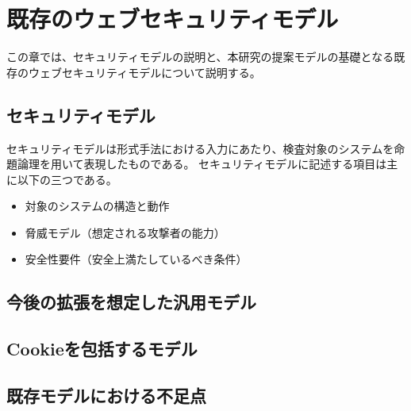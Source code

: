 \documentclass[12pt,a4paper]{jbook}
\begin{document}
\chapter{既存のウェブセキュリティモデル}
この章では、セキュリティモデルの説明と、本研究の提案モデルの基礎となる既存のウェブセキュリティモデルについて説明する。

\section{セキュリティモデル}
\label{sec:SecurityModel}
セキュリティモデルは形式手法における入力にあたり、検査対象のシステムを命題論理を用いて表現したものである。
セキュリティモデルに記述する項目は主に以下の三つである。
\begin{itemize}
\item 対象のシステムの構造と動作
\item 脅威モデル（想定される攻撃者の能力）
\item 安全性要件（安全上満たしているべき条件）
\end{itemize}

\section{今後の拡張を想定した汎用モデル}
\subsection{}

\section{Cookieを包括するモデル}

\section{既存モデルにおける不足点}
\end{document}
